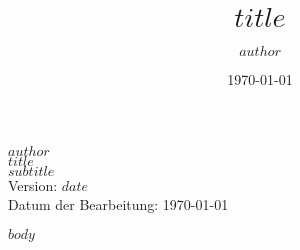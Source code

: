 \documentclass[11pt,a4paper]{report}
\title{$title$}
\author{$author$}
\date{\today \newpage}
\begin{document}

\cleardoublepage
\begin{titlepage}
    \centering
    \vfill
    {\small
        $author$\\
        \vskip1cm
        \bfseries
        \Huge
        $title$\\
        \huge
        $subtitle$\\
        \vskip1cm
    }
    {\Large
        Version: $date$\\
        \vskip0.5cm
        Datum der Bearbeitung: \today
    }     
    \vfill
\end{titlepage}

{
\hypersetup{linkcolor=black}
\setcounter{tocdepth}{6}
\tableofcontents
\newpage
}
\newpage
\setcounter{page}{1}
\setcounter{secnumdepth}{-1}


% 
%

$body$

% 
%
\newpage

\printbibliography[]


% 
% 

% 
%

% 
%


\end{document}

